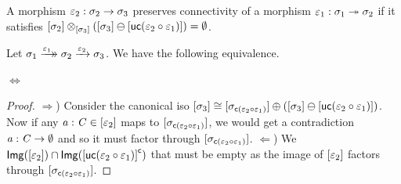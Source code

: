 \begin{definition}
    A morphism $\varepsilon_2 : \sigma_2 \to \sigma_3$ preserves connectivity of a morphism $\varepsilon_1 : \sigma_1 \twoheadrightarrow \sigma_2$
    if it satisfies $[\sigma_2] \otimes_{[\sigma_3]} ([\sigma_3] \ominus [\mathsf{uc}(\varepsilon_2 \circ \varepsilon_1)]) = \emptyset$.
\end{definition}

\begin{lemma}\label{lem:con-pres-prop-equiv}
    Let $\sigma_1 \xrightarrow[]{\varepsilon_1}\mathrel{\mkern-14mu}\rightarrow \sigma_2 \xrightarrow{\varepsilon_2} \sigma_3$.
    We have the following equivalence.

    \begin{center}
     $\Leftrightarrow$
    \end{center}
\end{lemma}
\begin{proof}\nl
    $\Rightarrow$) 
        Consider the canonical iso $[\sigma_3] \cong [\sigma_{\mathsf{c}(\varepsilon_2 \circ \varepsilon_1)}] \oplus ([\sigma_3] \ominus [\mathsf{uc}(\varepsilon_2 \circ \varepsilon_1)])$.
        Now if any $\mathit{a} : \mathit{C} \in [\varepsilon_2]$ maps to $[\sigma_{\mathsf{c}(\varepsilon_2 \circ \varepsilon_1)}]$, we would get a contradiction $\mathit{a} : \mathit{C} \to \emptyset$ and so
        it must factor through $[\sigma_{\mathsf{c}(\varepsilon_2 \circ \varepsilon_1)}]$.
    \nl
    $\Leftarrow$)
        We $\mathsf{Img}([\varepsilon_2]) \cap \mathsf{Img}({[\mathsf{uc}(\varepsilon_2 \circ \varepsilon_1)]}^\mathsf{c})$ that must be empty as the image of $[\varepsilon_2]$ factors through $[\sigma_{\mathsf{c}(\varepsilon_2 \circ \varepsilon_1)}]$. 
\end{proof}

